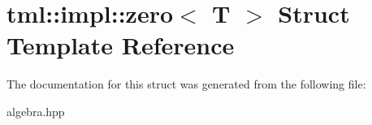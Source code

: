 \hypertarget{structtml_1_1impl_1_1zero}{\section{tml\+:\+:impl\+:\+:zero$<$ T $>$ Struct Template Reference}
\label{structtml_1_1impl_1_1zero}
}


The documentation for this struct was generated from the following file\+:\begin{DoxyCompactItemize}
\item 
algebra.\+hpp\end{DoxyCompactItemize}
